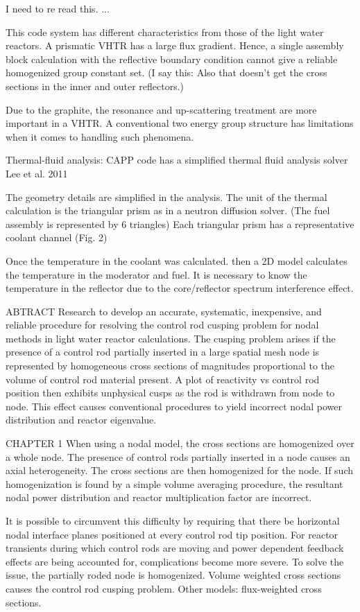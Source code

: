 I need to re read this.
...

This code system has different characteristics from those of the light
water reactors.
A prismatic VHTR has a large flux gradient.
Hence, a single assembly block calculation with the reflective boundary condition cannot give a reliable homogenized group constant set.
(I say this: Also that doesn't get the cross sections in the inner and outer reflectors.)

Due to the graphite, the resonance and up-scattering treatment are more important in a VHTR.
A conventional two energy group structure has limitations when it comes to handling such phenomena.

Thermal-fluid analysis:
CAPP code has a simplified thermal fluid analysis solver
Lee et al. 2011

The geometry details are simplified in the analysis.
The unit of the thermal calculation is the triangular prism as in a neutron diffusion solver.
(The fuel assembly is represented by 6 triangles)
Each triangular prism has a representative coolant channel (Fig. 2)

Once the temperature in the coolant was calculated. then a 2D model calculates the temperature in the moderator and fuel.
It is necessary to know the temperature in the reflector due to the core/reflector spectrum interference effect.

ABTRACT
Research to develop an accurate, systematic, inexpensive, and reliable procedure for resolving the control rod cusping problem for nodal methods in light water reactor calculations.
The cusping problem arises if the presence of a control rod partially inserted in a large spatial mesh node is represented by homogeneous cross sections of magnitudes proportional to the volume of control rod material present.
A plot of reactivity vs control rod position then exhibits unphysical cusps as the rod is withdrawn from node to node.
This effect causes conventional procedures to yield incorrect nodal power distribution and reactor eigenvalue.

CHAPTER 1
When using a nodal model, the cross sections are homogenized over a whole node.
The presence of control rods partially inserted in a node causes an axial heterogeneity.
The cross sections are then homogenized for the node.
If such homogenization is found by a simple volume averaging procedure, the resultant nodal power distribution and reactor multiplication factor are incorrect.

It is possible to circumvent this difficulty by requiring that there be horizontal nodal interface planes positioned at every control rod tip position.
For reactor transients during which control rods are moving and power dependent feedback effects are being accounted for, complications become more severe.
To solve the issue, the partially roded node is homogenized.
Volume weighted cross sections causes the control rod cusping problem.
Other models: flux-weighted cross sections.

